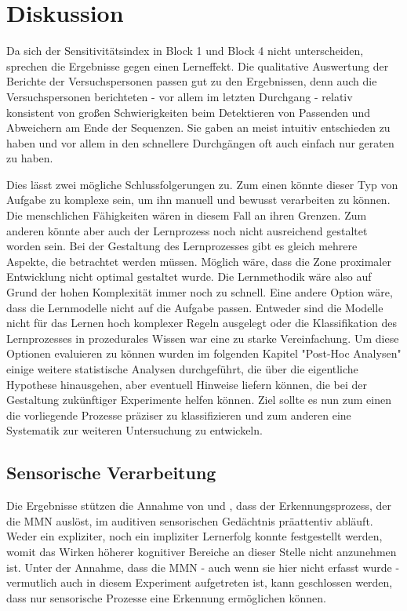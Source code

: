 \documentclass[doc,a4paper,12pt]{apa6}
\begin{document}

\section{Diskussion}

Da sich der Sensitivitätsindex in Block 1 und Block 4 nicht unterscheiden, sprechen die Ergebnisse gegen einen Lerneffekt. Die qualitative Auswertung der Berichte der Versuchspersonen passen gut zu den Ergebnissen, denn auch die Versuchspersonen berichteten - vor allem im letzten Durchgang - relativ konsistent von großen Schwierigkeiten beim Detektieren von Passenden und Abweichern am Ende der Sequenzen. Sie gaben an meist intuitiv entschieden zu haben und vor allem in den schnellere Durchgängen oft auch einfach nur geraten zu haben.

Dies lässt zwei mögliche Schlussfolgerungen zu. Zum einen könnte dieser Typ von Aufgabe zu komplexe sein, um ihn manuell und bewusst verarbeiten zu können. Die menschlichen Fähigkeiten wären in diesem Fall an ihren Grenzen. Zum anderen könnte aber auch der Lernprozess noch nicht ausreichend gestaltet worden sein. Bei der Gestaltung des Lernprozesses gibt es gleich mehrere Aspekte, die betrachtet werden müssen. Möglich wäre, dass die Zone proximaler Entwicklung nicht optimal gestaltet wurde. Die Lernmethodik wäre also auf Grund der hohen Komplexität immer noch zu schnell. Eine andere Option wäre, dass die Lernmodelle nicht auf die Aufgabe passen. Entweder sind die Modelle nicht für das Lernen hoch komplexer Regeln ausgelegt oder die Klassifikation des Lernprozesses in prozedurales Wissen war eine zu starke Vereinfachung. Um diese Optionen evaluieren zu können wurden im folgenden Kapitel "Post-Hoc Analysen" einige weitere statistische Analysen durchgeführt, die über die eigentliche Hypothese hinausgehen, aber eventuell Hinweise liefern können, die bei der Gestaltung zukünftiger Experimente helfen können. Ziel sollte es nun zum einen die vorliegende Prozesse präziser zu klassifizieren und zum anderen eine Systematik zur weiteren Untersuchung zu entwickeln.

\subsection{Sensorische Verarbeitung}

Die Ergebnisse stützen die Annahme von \textcite{paavilainen2007preattentive} und \textcite{bendixen2008rapid}, dass der Erkennungsprozess, der die MMN auslöst, im auditiven sensorischen Gedächtnis präattentiv abläuft. Weder ein expliziter, noch ein impliziter Lernerfolg konnte festgestellt werden, womit das Wirken höherer kognitiver Bereiche an dieser Stelle nicht anzunehmen ist. Unter der Annahme, dass die MMN - auch wenn sie hier nicht erfasst wurde - vermutlich auch in diesem Experiment aufgetreten ist, kann geschlossen werden, dass nur sensorische Prozesse eine Erkennung ermöglichen können.
\end{document}
